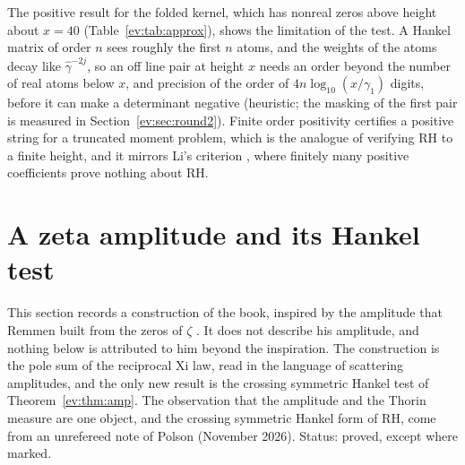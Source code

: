 The positive result for the folded kernel, which has nonreal zeros above height about $x=40$ (Table~\ref{ev:tab:approx}), shows the limitation of the test. A Hankel matrix of order $n$ sees roughly the first $n$ atoms, and the weights of the atoms decay like $\widehat\gamma^{-2j}$, so an off line pair at height $x$ needs an order beyond the number of real atoms below $x$, and precision of the order of $4n\log_{10}(x/\gamma_1)$ digits, before it can make a determinant negative (heuristic; the masking of the first pair is measured in Section~\ref{ev:sec:round2}). Finite order positivity certifies a positive string for a truncated moment problem, which is the analogue of verifying RH to a finite height, and it mirrors Li's criterion \cite{Li97}, where finitely many positive coefficients prove nothing about RH.

\section{A zeta amplitude and its Hankel test}\label{ev:sec:amp}

This section records a construction of the book, inspired by the amplitude that Remmen built from the zeros of $\zeta$ \cite{Remmen21}. %
It does not describe his amplitude, and nothing below is attributed to him beyond the inspiration. The construction is the pole sum of the reciprocal Xi law, read in the language of scattering amplitudes, and the only new result is the crossing symmetric Hankel test of Theorem~\ref{ev:thm:amp}. The observation that the amplitude and the Thorin measure are one object, and the crossing symmetric Hankel form of RH, come from an unrefereed note of Polson (November 2026). Status: proved, except where marked.

